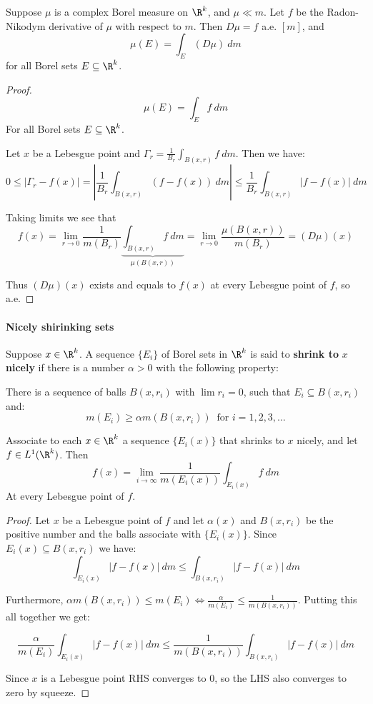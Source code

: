 \begin{theorem}\label{derivative}
Suppose $\mu$ is a complex Borel measure on $\R^k$, and $\mu \ll m$. Let $f$ be the Radon-Nikodym derivative of $\mu$ with respect to $m$. Then $D\mu = f$ a.e. $[m]$, and
\[\mu(E) = \int_E(D\mu)~dm\] for all Borel sets $E\subseteq \R^k$.
\begin{proof}
    \[\mu(E) = \int_E f~dm\] For all Borel sets $E\subseteq \R^k$.

    Let $x$ be a Lebesgue point and $\Gamma_r = \frac{1}{B_r}\int_{B(x,r)}f~dm$. Then we have:\begin{equation*}
        0\leq |\Gamma_r - f(x)| = |\frac{1}{B_r}\int_{B(x,r)}(f-f(x))~dm| \leq \frac{1}{B_r}\int_{B(x,r)}|f-f(x)|~dm
    \end{equation*}

    Taking limits we see that \[f(x) = \lim_{r\rightarrow 0}\frac{1}{m(B_r)}\underbrace{\int_{B(x,r)}f~dm}_{\mu(B(x,r))} = \lim_{r\rightarrow 0}\frac{\mu(B(x,r))}{m(B_r)} = (D\mu)(x) \]

    Thus $(D\mu)(x)$ exists and equals to $f(x)$ at every Lebesgue point of $f$, so a.e.
\end{proof}
\end{theorem}

\paragraph*{Nicely shirinking sets}
\begin{definition}
Suppose $x\in \R^k$. A sequence $\{E_i\}$ of Borel sets in $\R^k$ is said to \textbf{shrink to }$x$\textbf{ nicely} if there is a number $\alpha>0$ with the following property:\begin{center}
    There is a sequence of balls $B(x,r_i)$ with $\lim r_i = 0$, such that $E_i\subseteq B(x,r_i)$ and:\[m(E_i) \geq \alpha m(B(x,r_i)) \ \text{ for }i=1,2,3,\ldots \]
\end{center}
\end{definition}

\begin{theorem}
Associate to each $x\in \R^k$ a sequence $\{E_i(x)\}$ that shrinks to $x$ nicely, and let $f\in L^1(\R^k)$. Then \[f(x) = \lim_{i\rightarrow \infty}\frac{1}{m(E_i(x))}\int_{E_i(x)} f~dm \]
At every Lebesgue point of $f$.

\begin{proof}
    Let $x$ be a Lebesgue point of $f$ and let $\alpha(x)$ and $B(x,r_i)$ be the positive number and the balls associate with $\{E_i(x)\}$. Since $E_i(x)\subseteq B(x,r_i)$ we have:
    \[\int_{E_i(x)}|f-f(x)|~dm \leq \int_{B(x,r_i)}|f-f(x)|~dm \]

    Furthermore, $\alpha m(B(x,r_i))\leq m(E_i) \iff \frac{\alpha}{m(E_i)}\leq \frac{1}{m(B(x,r_i))}$. Putting this all together we get:

    \[\frac{\alpha}{m(E_i)}\int_{E_i(x)}|f-f(x)|~dm \leq \frac{1}{m(B(x,r_i))}\int_{B(x,r_i)}|f-f(x)|~dm\]

    Since $x$ is a Lebesgue point RHS converges to $0$, so the LHS also converges to zero by squeeze.
\end{proof}
\end{theorem}

